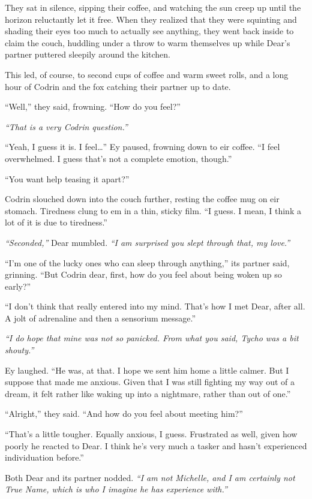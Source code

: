 They sat in silence, sipping their coffee, and watching the sun creep up until the horizon reluctantly let it free. When they realized that they were squinting and shading their eyes too much to actually see anything, they went back inside to claim the couch, huddling under a throw to warm themselves up while Dear's partner puttered sleepily around the kitchen.

This led, of course, to second cups of coffee and warm sweet rolls, and a long hour of Codrin and the fox catching their partner up to date.

``Well,'' they said, frowning. ``How do you feel?''

\emph{``That is a very Codrin question.''}

``Yeah, I guess it is. I feel\ldots{}'' Ey paused, frowning down to eir coffee. ``I feel overwhelmed. I guess that's not a complete emotion, though.''

``You want help teasing it apart?''

Codrin slouched down into the couch further, resting the coffee mug on eir stomach. Tiredness clung to em in a thin, sticky film. ``I guess. I mean, I think a lot of it is due to tiredness.''

\emph{``Seconded,''} Dear mumbled. \emph{``I am surprised you slept through that, my love.''}

``I'm one of the lucky ones who can sleep through anything,'' its partner said, grinning. ``But Codrin dear, first, how do you feel about being woken up so early?''

``I don't think that really entered into my mind. That's how I met Dear, after all. A jolt of adrenaline and then a sensorium message.''

\emph{``I do hope that mine was not so panicked. From what you said, Tycho was a bit shouty.''}

Ey laughed. ``He was, at that. I hope we sent him home a little calmer. But I suppose that made me anxious. Given that I was still fighting my way out of a dream, it felt rather like waking up into a nightmare, rather than out of one.''

``Alright,'' they said. ``And how do you feel about meeting him?''

``That's a little tougher. Equally anxious, I guess. Frustrated as well, given how poorly he reacted to Dear. I think he's very much a tasker and hasn't experienced individuation before.''

Both Dear and its partner nodded. \emph{``I am not Michelle, and I am certainly not True Name, which is who I imagine he has experience with.''}

